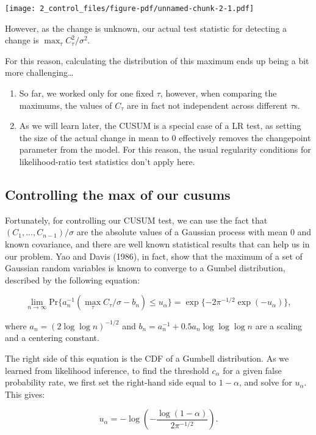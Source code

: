 \documentclass[
  letterpaper,
  DIV=11,
  numbers=noendperiod]{scrreprt}
\providecommand{\tightlist}{%
  \setlength{\itemsep}{0pt}\setlength{\parskip}{0pt}}\usepackage{longtable,booktabs,array}
\begin{document}
\texttt{[image: 2\_control\_files/figure-pdf/unnamed-chunk-2-1.pdf]}

However, as the change is unknown, our actual test statistic for
detecting a change is \(\max_\tau C_\tau^2/σ^2\).

For this reason, calculating the distribution of this maximum ends up
being a bit more challenging\ldots{}

\begin{enumerate}
\def\labelenumi{\arabic{enumi}.}
\tightlist
\item
  So far, we worked only for one fixed \(\tau\), however, when comparing
  the maximums, the values of \(C_\tau\) are in fact not independent
  across different \(\tau\)s.
\item
  As we will learn later, the CUSUM is a special case of a LR test, as
  setting the size of the actual change in mean to 0 effectively removes
  the changepoint parameter from the model. For this reason, the usual
  regularity conditions for likelihood-ratio test statistics don't apply
  here.
\end{enumerate}

\subsection{Controlling the max of our cusums}\label{sec-cusum-control}

Fortunately, for controlling our CUSUM test, we can use the fact that
\((C_1, ..., C_{n-1})/ \sigma\) are the absolute values of a Gaussian
process with mean 0 and known covariance, and there are well known
statistical results that can help us in our problem. Yao and Davis
(1986), in fact, show that the maximum of a set of Gaussian random
variables is known to converge to a Gumbel distribution, described by
the following equation:

\[
\lim_{n→\infty} \text{Pr}\{a_n^{-1}(\max_\tau C_\tau/\sigma - b_n) ≤ u_\alpha\} = \exp\{-2π^{-1/2}\exp(-u_\alpha)\},
\]

where \(a_n = (2 \log \log n)^{-1/2}\) and
\(b_n = a_n^{-1} + 0.5a_n \log \log \log n\) are a scaling and a
centering constant.

The right side of this equation is the CDF of a Gumbell distribution. As
we learned from likelihood inference, to find the threshold
\(c_{\alpha}\) for a given false probability rate, we first set the
right-hand side equal to \(1 - \alpha\), and solve for \(u_\alpha\).
This gives:

\[
u_\alpha = -\log\left( -\frac{\log(1-\alpha)}{2\pi^{-1/2}} \right).
\]
\end{document}
